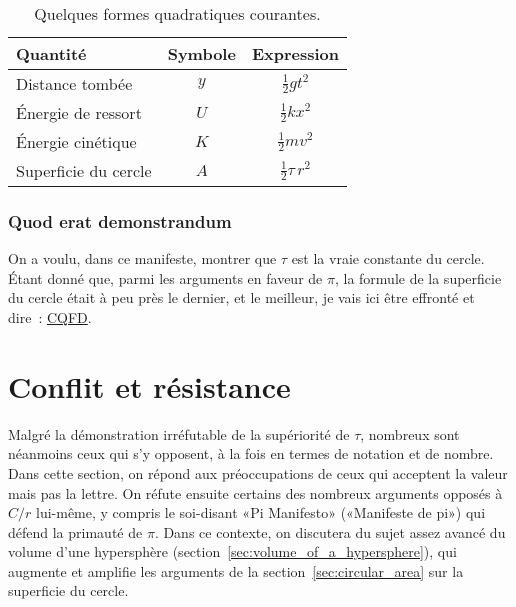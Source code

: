\begin{table}
\begin{center}
\begin{tabular}{lcc}
Quantité & Symbole & Expression \\ \hline
Distance tombée & $y$ & $\textstyle{\frac{1}{2}}gt^2$ \smallskip \\
Énergie de ressort & $U$ & $\textstyle{\frac{1}{2}}kx^2$ \smallskip \\
Énergie cinétique & $K$ & $\textstyle{\frac{1}{2}}mv^2$ \smallskip \\
Superficie du cercle & $A$ & $\textstyle{\frac{1}{2}}\tau\,r^2$
\end{tabular}
\end{center}
\caption{Quelques formes quadratiques courantes.\label{table:quadratic_forms}}
\end{table}

    \subsubsection{Quod erat demonstrandum} %
    \label{sec:quod_erat_demonstrandum}

On a voulu, dans ce manifeste, montrer que $\tau$ est la vraie constante du
cercle. Étant donné que, parmi les arguments en faveur de $\pi$, la formule de la superficie du cercle était à peu près
le dernier, et le meilleur, je vais ici être
effronté et dire~:
\href{https://fr.wikipedia.org/wiki/CQFD_(math%C3%A9matiques)}{CQFD}.



\section{Conflit et résistance} %
\label{sec:conflict_and_resistance}

Malgré la démonstration irréfutable de la supériorité de $\tau$, nombreux sont
néanmoins ceux qui s'y opposent, à la fois en termes de notation et de nombre. Dans cette
section, on répond aux préoccupations de ceux qui acceptent la valeur mais pas
la lettre. On réfute ensuite certains des nombreux arguments opposés à $C/r$
lui-même, y compris le soi-disant «\ns Pi Manifesto\ns » («\ns Manifeste de pi\ns ») qui
défend la primauté de $\pi$. Dans ce contexte, on discutera du sujet assez
avancé du volume d'une hypersphère
(section~\ref{sec:volume_of_a_hypersphere}), qui augmente et amplifie les
arguments de la section~\ref{sec:circular_area} sur la superficie du cercle.

